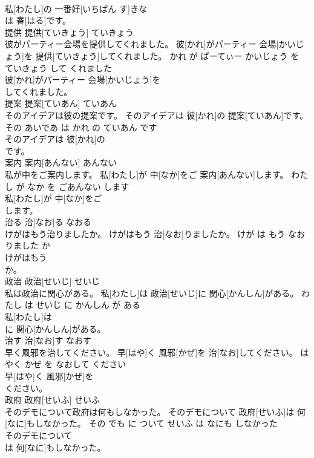 \documentclass[8pt]{extreport}
\begin{document}
\begin{CJK}{UTF8}{min}
\\	私[わたし]の 一番好[いちばん す]きな
\\	は 春[はる]です。			
\\	提供	提供[ていきょう]	ていきょう	
\\	彼がパーティー会場を提供してくれました。	彼[かれ]がパーティー 会場[かいじょう]を 提供[ていきょう]してくれました。	かれ が ぱーてぃー かいじょう を ていきょう して くれました	
\\	彼[かれ]がパーティー 会場[かいじょう]を
\\	してくれました。			
\\	提案	提案[ていあん]	ていあん	
\\	そのアイデアは彼の提案です。	そのアイデアは 彼[かれ]の 提案[ていあん]です。	その あいであ は かれ の ていあん です	
\\	そのアイデアは 彼[かれ]の
\\	です。			
\\	案内	案内[あんない]	あんない	
\\	私が中をご案内します。	私[わたし]が 中[なか]をご 案内[あんない]します。	わたし が なか を ごあんない します	
\\	私[わたし]が 中[なか]をご
\\	します。			
\\	治る	治[なお]る	なおる	
\\	けがはもう治りましたか。	けがはもう 治[なお]りましたか。	けが は もう なおりました か	
\\	けがはもう
\\	か。			
\\	政治	政治[せいじ]	せいじ	
\\	私は政治に関心がある。	私[わたし]は 政治[せいじ]に 関心[かんしん]がある。	わたし は せいじ に かんしん が ある	
\\	私[わたし]は
\\	に 関心[かんしん]がある。			
\\	治す	治[なお]す	なおす	
\\	早く風邪を治してください。	早[はや]く 風邪[かぜ]を 治[なお]してください。	はやく かぜ を なおして ください	
\\	早[はや]く 風邪[かぜ]を
\\	ください。			
\\	政府	政府[せいふ]	せいふ	
\\	そのデモについて政府は何もしなかった。	そのデモについて 政府[せいふ]は 何[なに]もしなかった。	その でも に ついて せいふ は なにも しなかった	
\\	そのデモについて
\\	は 何[なに]もしなかった。			

\end{CJK}
\end{document}
